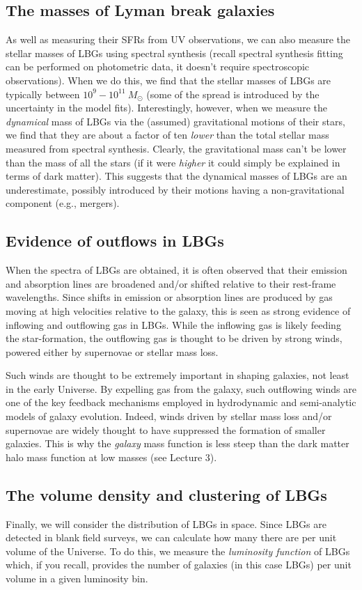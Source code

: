 \documentclass[11pt]{article}
\begin{document}
\subsection{The masses of Lyman break galaxies}
As well as measuring their SFRs from UV observations, we can also
measure the stellar masses of LBGs using spectral synthesis (recall
spectral synthesis fitting can be performed on photometric data, it
doesn't require spectroscopic observations). When we do this, we find
that the stellar masses of LBGs are typically between
$10^9-10^{11}~M_{\odot}$ (some of the spread is introduced by the
uncertainty in the model fits). Interestingly, however, when we
measure the {\it dynamical} mass of LBGs via the (assumed)
gravitational motions of their stars, we find that they are about a
factor of ten {\it lower} than the total stellar mass measured from
spectral synthesis. Clearly, the gravitational mass can't be lower
than the mass of all the stars (if it were {\it higher} it could
simply be explained in terms of dark matter). This suggests that the
dynamical masses of LBGs are an underestimate, possibly introduced by
their motions having a non-gravitational component (e.g., mergers).

\subsection{Evidence of outflows in LBGs}
When the spectra of LBGs are obtained, it is often observed that their
emission and absorption lines are broadened and/or shifted relative to
their rest-frame wavelengths. Since shifts in emission or absorption
lines are produced by gas moving at high velocities relative to the
galaxy, this is seen as strong evidence of inflowing and outflowing
gas in LBGs. While the inflowing gas is likely feeding the
star-formation, the outflowing gas is thought to be driven by strong
winds, powered either by supernovae or stellar mass loss.

Such winds are thought to be extremely important in shaping galaxies,
not least in the early Universe. By expelling gas from the galaxy,
such outflowing winds are one of the key feedback mechanisms employed
in hydrodynamic and semi-analytic models of galaxy evolution. Indeed,
winds driven by stellar mass loss and/or supernovae are widely thought
to have suppressed the formation of smaller galaxies. This is why the
{\it galaxy} mass function is less steep than the dark matter halo
mass function at low masses (see Lecture 3).

\subsection{The volume density and clustering of LBGs}
Finally, we will consider the distribution of LBGs in space. Since
LBGs are detected in blank field surveys, we can calculate how many
there are per unit volume of the Universe. To do this, we measure the
{\it luminosity function} of LBGs which, if you recall, provides the
number of galaxies (in this case LBGs) per unit volume in a given
luminosity bin.
\end{document}

